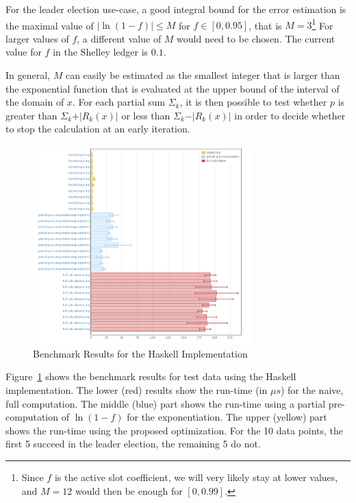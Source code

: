 \documentclass[11pt,a4paper,dvipsnames,twosided]{article}
\theoremstyle{definition}
\theoremstyle{definition}
\begin{document}
For the leader election use-case, a good integral bound for the error estimation
is the maximal value of $\vert\ln(1 - f)\vert\leq M$ for $f \in [0, 0.95]$, that
is $M = 3$\footnote{Since $f$ is the active slot coefficient, we will very
  likely stay at lower values, and $M=12$ would then be enough for $[0, 0.99].$}
For larger values of $f$, a different value of $M$ would need to be chosen. The
current value for $f$ in the Shelley ledger is $0.1$.

In general, $M$ can easily be estimated as the smallest
integer that is larger than the exponential function that is evaluated at
the upper bound of the interval of the domain of $x$. For each partial sum $\Sigma_{k}$, it
is then possible to test whether $p$ is greater than $\Sigma_k + \vert R_{k}(x) \vert$ or less than
$\Sigma_k - \vert R_{k}(x)\vert$ in order to decide whether to stop the calculation at an early
iteration.

\begin{figure}[ht]
  \centering
  \includegraphics[width=0.75\textwidth]{haskell.png}
  \caption{Benchmark Results for the Haskell Implementation}
  \label{fig:haskell-optimization-results}
\end{figure}

Figure~\ref{fig:haskell-optimization-results} shows the benchmark results for
test data using the Haskell implementation. The lower (red) results show the
run-time (in $\mu s$) for the naive, full computation. The middle (blue) part
shows the run-time using a partial pre-computation of $\ln (1-f)$ for the
exponentiation. The upper (yellow) part shows the run-time using the proposed
optimization. For the 10 data points, the first 5 succeed in the leader
election, the remaining 5 do not.

% 


\end{document}
